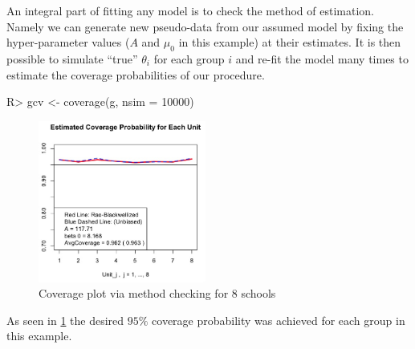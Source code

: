 \documentclass[article]{jss}
\begin{document}
An integral part of fitting any model is to check the method of estimation. Namely we can generate new pseudo-data from our assumed model by fixing the hyper-parameter values ($A$ and $\mu_0$ in this example) at their estimates. It is then possible to simulate ``true'' $\theta_i$ for each group $i$ and re-fit the model many times to estimate the coverage probabilities of our procedure.  

\begin{CodeChunk}
\begin{CodeInput}
R> gcv <- coverage(g, nsim = 10000)
\end{CodeInput}
\end{CodeChunk}
\begin{figure}[h] 
\begin{center}
\includegraphics[width = 5.5cm]{school2.png}
\caption{Coverage plot via method checking for 8 schools}
\end{center}
\label{schoolcoverage}
\end{figure}
As seen in \ref{schoolcoverage} the desired $95\%$ coverage probability was achieved for each group in this example.

\end{document}
